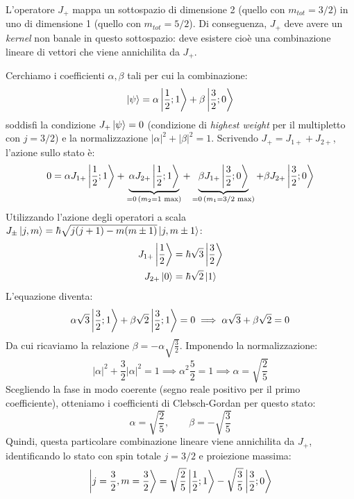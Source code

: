 \noindent
L'operatore $J_+$ mappa un sottospazio di dimensione 2 (quello con $m_{tot} = 3/2$) in uno di dimensione 1 (quello con $m_{tot} = 5/2$). Di conseguenza, $J_+$ deve avere un \textit{kernel} non banale in questo sottospazio: deve esistere cioè una combinazione lineare di vettori che viene annichilita da $J_+$.

Cerchiamo i coefficienti $\alpha, \beta$ tali per cui la combinazione:
\[
    \ket{\psi} = \alpha \ket{\frac{1}{2}; 1} + \beta \ket{\frac{3}{2}; 0}
\]
soddisfi la condizione $J_+ \ket{\psi} = 0$ (condizione di \textit{highest weight} per il multipletto con $j=3/2$) e la normalizzazione $|\alpha|^2 + |\beta|^2 = 1$.
Scrivendo $J_+ = J_{1+} + J_{2+}$, l'azione sullo stato è:
\[
    0 = \alpha J_{1+} \ket{\frac{1}{2}; 1} + \underbrace{\alpha J_{2+} \ket{\frac{1}{2}; 1}}_{=0 \, (m_2=1 \text{ max})} + \underbrace{\beta J_{1+} \ket{\frac{3}{2}; 0}}_{=0 \, (m_1=3/2 \text{ max})} + \beta J_{2+} \ket{\frac{3}{2}; 0}
\]
Utilizzando l'azione degli operatori a scala $J_{\pm}\ket{j,m} = \hbar\sqrt{j(j+1) - m(m\pm 1)}\ket{j, m\pm 1}$:
\begin{align*}
    J_{1+} \ket{\frac{1}{2}} &= \hbar\sqrt{3} \ket{\frac{3}{2}} \\
    J_{2+} \ket{0} &= \hbar\sqrt{2} \ket{1}
\end{align*}
L'equazione diventa:
\[
    \alpha \sqrt{3} \ket{\frac{3}{2}; 1} + \beta \sqrt{2} \ket{\frac{3}{2}; 1} = 0 \implies \alpha\sqrt{3} + \beta\sqrt{2} = 0
\]
Da cui ricaviamo la relazione $\beta = -\alpha\sqrt{\frac{3}{2}}$. Imponendo la normalizzazione:
\[
    |\alpha|^2 + \frac{3}{2}|\alpha|^2 = 1 \implies \alpha^2 \frac{5}{2} = 1 \implies \alpha = \sqrt{\frac{2}{5}}
\]
Scegliendo la fase in modo coerente (segno reale positivo per il primo coefficiente), otteniamo i coefficienti di Clebsch-Gordan per questo stato:
\[
    \alpha = \sqrt{\frac{2}{5}}, \qquad \beta = - \sqrt{\frac{3}{5}}
\]
Quindi, questa particolare combinazione lineare viene annichilita da $J_+$, identificando lo stato con spin totale $j=3/2$ e proiezione massima:
\begin{equation}
    \ket{j=\frac{3}{2}, m=\frac{3}{2}} = \sqrt{\frac{2}{5}} \ket{\frac{1}{2}; 1} - \sqrt{\frac{3}{5}} \ket{\frac{3}{2}; 0}
\end{equation}

